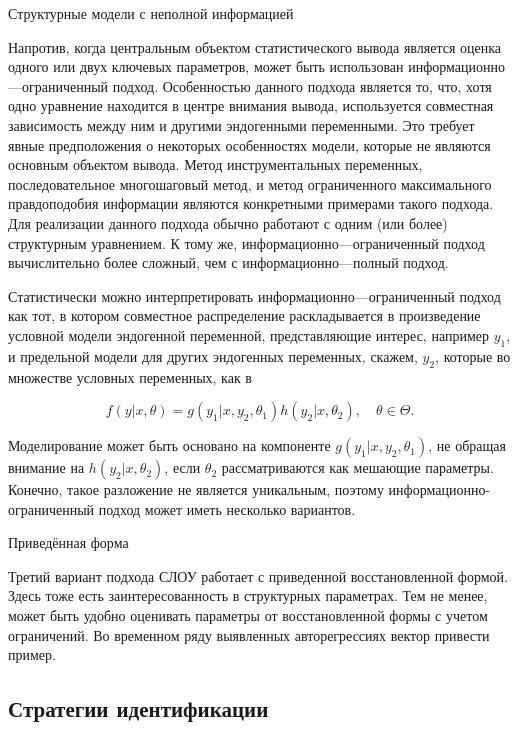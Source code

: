 	
\begin{center}
Структурные модели с неполной информацией
\end{center}


Напротив, когда центральным объектом статистического вывода является оценка одного или двух ключевых параметров, может быть использован информационно---ограниченный подход. Особенностью данного подхода является то, что, хотя одно уравнение находится в центре внимания вывода, используется совместная зависимость между ним и другими эндогенными переменными. Это требует явные предположения о некоторых особенностях модели, которые не являются основным объектом вывода. Метод инструментальных переменных, последовательное многошаговый метод, и метод ограниченного максимального правдоподобия информации являются конкретными примерами такого подхода. Для реализации данного подхода обычно работают с одним (или более) структурным уравнением. К тому же, информационно---ограниченный  подход вычислительно более сложный, чем с информационно---полный подход.


	Статистически можно интерпретировать информационно---ограниченный подход как тот, в котором совместное распределение раскладывается в произведение условной модели эндогенной переменной, представляющие интерес, например $y_{1}$, и предельной модели для других эндогенных переменных, скажем, $y_{2}$, которые во множестве условных переменных, как в

\begin{equation}
f(y|x,\theta)=g(y_{1}|x,y_{2},\theta_{1})h(y_{2}|x,\theta_{2}), \quad \theta \in \Theta.
\end{equation}


Моделирование может быть основано на компоненте $g(y_{1}|x,y_{2},\theta_{1})$, не обращая внимание на $h(y_{2}|x,\theta_{2})$, если $\theta_{2}$ рассматриваются как мешающие параметры. Конечно, такое разложение не является уникальным, поэтому информационно-ограниченный подход может иметь несколько вариантов.


\begin{center}
Приведённая форма
\end{center}


Третий вариант подхода СЛОУ работает с приведенной восстановленной формой. Здесь тоже есть заинтересованность в структурных параметрах. Тем не менее, может быть удобно оценивать параметры от восстановленной формы с учетом ограничений. Во временном ряду выявленных авторегрессиях вектор привести пример.


\subsection{Стратегии идентификации}


